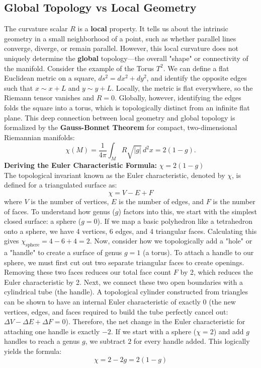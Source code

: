 \documentclass[11pt, a4paper]{report}
\begin{document}
\subsection*{Global Topology vs Local Geometry}
The curvature scalar $R$ is a \textbf{local} property. It tells us about the intrinsic geometry in a small neighborhood of a point, such as whether parallel lines converge, diverge, or remain parallel. However, this local curvature does not uniquely determine the \textbf{global} topology—the overall "shape" or connectivity of the manifold.
Consider the example of the Torus $T^2$. We can define a flat Euclidean metric on a square, $ds^2 = dx^2 + dy^2$, and identify the opposite edges such that $x \sim x+L$ and $y \sim y+L$. Locally, the metric is flat everywhere, so the Riemann tensor vanishes and $R=0$. Globally, however, identifying the edges folds the square into a torus, which is topologically distinct from an infinite flat plane. 
This deep connection between local geometry and global topology is formalized by the \textbf{Gauss-Bonnet Theorem} for compact, two-dimensional Riemannian manifolds:
\begin{equation}
\chi(M) = \frac{1}{4\pi} \int_M R \sqrt{|g|} \, d^2x = 2(1-g). \label{eq:gauss_bonnet}
\end{equation}
\textbf{Deriving the Euler Characteristic Formula: } \(\chi = 2(1-g)\) \\
The topological invariant known as the Euler characteristic, denoted by $\chi$, is defined for a triangulated surface as:
\begin{equation} \chi = V - E + F \label{eq:euler_def} \end{equation}
where $V$ is the number of vertices, $E$ is the number of edges, and $F$ is the number of faces. To understand how genus ($g$) factors into this, we start with the simplest closed surface: a sphere ($g=0$). If we map a basic polyhedron like a tetrahedron onto a sphere, we have 4 vertices, 6 edges, and 4 triangular faces. Calculating this gives $\chi_{\text{sphere}} = 4 - 6 + 4 = 2$.
Now, consider how we topologically add a "hole" or a "handle" to create a surface of genus $g=1$ (a torus). To attach a handle to our sphere, we must first cut out two separate triangular faces to create openings. Removing these two faces reduces our total face count $F$ by 2, which reduces the Euler characteristic by 2.
Next, we connect these two open boundaries with a cylindrical tube (the handle). A topological cylinder constructed from triangles can be shown to have an internal Euler characteristic of exactly 0 (the new vertices, edges, and faces required to build the tube perfectly cancel out: $\Delta V - \Delta E + \Delta F = 0$).
Therefore, the net change in the Euler characteristic for attaching one handle is exactly $-2$. If we start with a sphere ($\chi = 2$) and add $g$ handles to reach a genus $g$, we subtract $2$ for every handle added. This logically yields the formula:
\begin{equation} \chi = 2 - 2g = 2(1-g) \label{eq:genus_formula} \end{equation}
\end{document}

